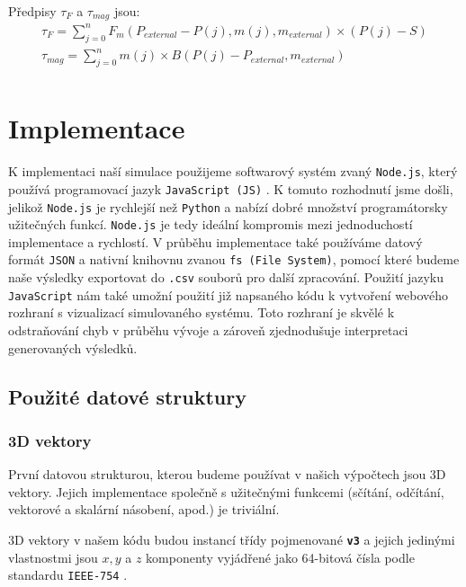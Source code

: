 Předpisy $\tau_F$ a $\tau_{mag}$ jsou:
\begin{equation}
    \label{eq:sim_equations2}
    \begin{gathered}
        \tau_F = \sum_{j=0}^{n} F_m(P_{external}- P(j), m(j), m_{external}) \times (P(j) - S)\\
        \tau_{mag} = \sum_{j=0}^{n} m(j) \times B(P(j)-P_{external},m_{external})\\
    \end{gathered}
\end{equation}

\section{Implementace}
K implementaci naší simulace použijeme softwarový systém zvaný \texttt{Node.js}, který používá programovací jazyk \texttt{JavaScript (JS)} \cite{JS}. K tomuto rozhodnutí jsme došli, jelikož \texttt{Node.js} je rychlejší než \texttt{Python} a nabízí dobré množství programátorsky užitečných funkcí. \texttt{Node.js} je tedy ideální kompromis mezi jednoduchostí implementace a rychlostí. V průběhu implementace také používáme datový formát \texttt{JSON} \cite{JSON} a nativní knihovnu zvanou \texttt{fs (File System)}, pomocí které budeme naše výsledky exportovat do \texttt{.csv} souborů pro další zpracování. Použití jazyku \texttt{JavaScript} nám také umožní použití již napsaného kódu k vytvoření webového rozhraní s vizualizací simulovaného systému. Toto rozhraní je skvělé k odstraňování chyb v průběhu vývoje a zároveň zjednodušuje interpretaci generovaných výsledků.

\subsection{Použité datové struktury}

\subsubsection{3D vektory}

První datovou strukturou, kterou budeme používat v našich výpočtech jsou 3D vektory. Jejich implementace společně s užitečnými funkcemi (sčítání, odčítání, vektorové a skalární násobení, apod.) je triviální.

3D vektory v našem kódu budou instancí třídy pojmenované \textbf{\texttt{v3}} a jejich jedinými vlastnostmi jsou $x,y$ a $z$ komponenty vyjádřené jako 64-bitová čísla podle standardu \texttt{IEEE-754} \cite{IEEE-754}.

